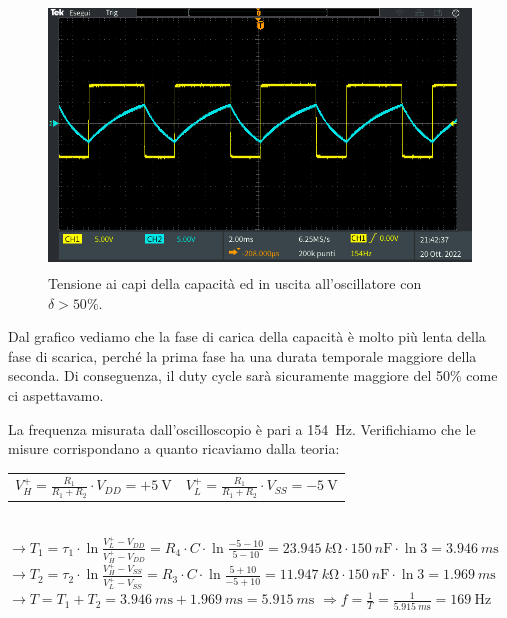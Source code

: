 \documentclass{report}
\begin{document}
\begin{figure}[h!]
	\centering
	\includegraphics[height=7.1cm]{immagini/TEK00033}
	\caption{Tensione ai capi della capacità ed in uscita all'oscillatore con $\delta>50\%$.}
	\label{figura:oscillo4_1}
\end{figure}
Dal grafico vediamo che la fase di carica della capacità è molto più lenta della fase di scarica, perché la prima fase ha una durata temporale maggiore della seconda. Di conseguenza, il duty cycle sarà sicuramente maggiore del 50\% come ci aspettavamo. \par
La frequenza misurata dall'oscilloscopio è pari a \SI{154}{\hertz}. Verifichiamo che le misure corrispondano a quanto ricaviamo dalla teoria:
\begin{table}[h!]
	\begin{tabular}{cc}
		\;\;\;$\displaystyle{V_H^+=\frac{R_1}{R_1+R_2}\cdot V_{DD}=+\SI{5}{\volt}}$\;\;\;\;\;\;\;\;\;\;\;\;\;\;\;\;\;\;\;\;\;\;\; & $\displaystyle{V_L^+=\frac{R_1}{R_1+R_2}\cdot V_{SS}=-\SI{5}{\volt}}$\\ 
	\end{tabular}
\end{table}
\\\indent$\rightarrow\displaystyle{T_1=\tau_1\cdot\ln\frac{V_L^+-V_{DD}}{V_H^+-V_{DD}}=R_4\cdot C\cdot\ln\frac{-5-10}{5-10}=\SI{23.945}{k\ohm}\cdot\SI{150}{n\farad}\cdot\ln3}=\SI{3.946}{m\second}$
\\[6pt]\indent$\rightarrow\displaystyle{T_2=\tau_2\cdot\ln\frac{V_H^+-V_{SS}}{V_L^+-V_{SS}}=R_3\cdot C\cdot\ln\frac{5+10}{-5+10}=\SI{11.947}{k\ohm}\cdot\SI{150}{n\farad}\cdot\ln3}=\SI{1.969}{m\second}$
\\[6pt]\indent$\rightarrow\displaystyle{T=T_1+T_2=\SI{3.946}{m\second}+\SI{1.969}{m\second}=\SI{5.915}{m\second}}$ \indent$\Rightarrow\displaystyle{f=\frac{1}{T}=\frac{1}{\SI{5.915}{m\second}}= \SI{169}{\hertz}}$
\end{document}
